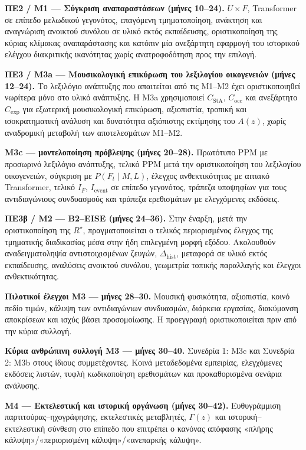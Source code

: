 \documentclass[11pt,a4paper]{article}
\begin{document}
\textbf{ΠΕ2 / M1 --- Σύγκριση αναπαραστάσεων (μήνες 10--24).} $U\times F$, Transformer σε επίπεδο μελωδικού γεγονότος, επαγόμενη τμηματοποίηση, ανάκτηση και αναγνώριση ανοικτού συνόλου σε υλικό εκτός εκπαίδευσης, οριστικοποίηση της κύριας κλίμακας αναπαράστασης και κατόπιν μία ανεξάρτητη εφαρμογή του ιστορικού ελέγχου διακριτικής ικανότητας χωρίς ανατροφοδότηση προς την επιλογή.

\textbf{ΠΕ3 / M3a --- Μουσικολογική επικύρωση του λεξιλογίου οικογενειών (μήνες 12--24).} Το λεξιλόγιο ανάπτυξης που απαιτείται από τις M1--M2 έχει οριστικοποιηθεί νωρίτερα μόνο στο υλικό ανάπτυξης. Η M3a χρησιμοποιεί $C_{\mathrm{StA}}$, $C_{\mathrm{occ}}$ και ανεξάρτητο $C_{\mathrm{exp}}$ για εξωτερική μουσικολογική επικύρωση, αξιοπιστία, τροπική και ισοκρατηματική ανάλυση και δυνατότητα αξιόπιστης εκτίμησης του $A(z)$, χωρίς αναδρομική μεταβολή των αποτελεσμάτων M1--M2.

\textbf{M3c --- μοντελοποίηση πρόβλεψης (μήνες 20--28).} Πρωτότυπο PPM με προσωρινό λεξιλόγιο ανάπτυξης, τελικό PPM μετά την οριστικοποίηση του λεξιλογίου οικογενειών, σύγκριση με $P(F_t\mid M,L)$, έλεγχος ανθεκτικότητας με αιτιακό Transformer, τελικό $I_F$, $I_{\mathrm{event}}$ σε επίπεδο γεγονότος, τράπεζα υποψηφίων για τους αντιδιαγώνιους συνδυασμούς και τράπεζα ερεθισμάτων με ελεγχόμενες εκδόσεις.

\textbf{ΠΕ3β / M2 --- B2--EISE (μήνες 24--36).} Στην έναρξη, μετά την οριστικοποίηση της $R^\star$, πραγματοποιείται ο τελικός περιορισμένος έλεγχος της τμηματικής διαδικασίας μέσα στην ήδη επιλεγμένη μορφή εξόδου. Ακολουθούν αναδειγματοληψία αντιστοιχισμένων ζευγών, $\Delta_{\mathrm{hist}}$, μεταφορά σε υλικό εκτός εκπαίδευσης, αναλύσεις ανοικτού συνόλου, γεωμετρία τοπικής παραλλαγής και έλεγχοι ανθεκτικότητας.

\textbf{Πιλοτικοί έλεγχοι M3 --- μήνες 28--30.} Μουσική φυσικότητα, αξιοπιστία, κοινό πεδίο τιμών, κάλυψη των αντιδιαγώνιων συνδυασμών, διάρκεια εργασίας, διακύμανση αποκρίσεων και ισχύς βάσει προσομοίωσης. Η προεγγραφή οριστικοποιείται πριν από την κύρια συλλογή.

\textbf{Κύρια ανθρώπινη συλλογή M3 --- μήνες 30--40.} Συνεδρία 1: M3c και Συνεδρία 2: M3b στους ίδιους συμμετέχοντες. Κοινά μεταδεδομένα εμπειρίας, ελεγχόμενες εκδόσεις λιστών, τυφλή κωδικοποίηση ερεθισμάτων και προκαθορισμένα σενάρια ανάλυσης.

\textbf{M4 --- Εκτελεστική και ιστορική οργάνωση (μήνες 30--42).} Ευθυγράμμιση παρτιτούρας--ηχογράφησης, εκτελεστικές μεταβλητές, $\Gamma(z)$ και ιστορική–εκτελεστική σύνθεση στο επίπεδο που επιτρέπει ο κανόνας απόφασης «πλήρης κάλυψη»/«περιορισμένη κάλυψη»/«ανεπαρκής κάλυψη».
\end{document}
